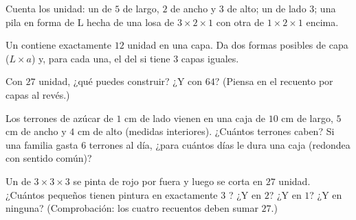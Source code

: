 \begin{exercise}[$\star$]\label{exo:g5:solids:6}
Cuenta los  unidad: un  de $5$ de largo, $2$ de ancho y $3$ de alto; un  de
lado $3$; una pila en forma de L hecha de una losa de $3 \times 2 \times 1$
con otra de $1 \times 2 \times 1$ encima.
\end{exercise}

\begin{exercise}[$\star$]\label{exo:g5:solids:7}
Un  contiene exactamente $12$  unidad en una capa. Da dos formas posibles
de capa ($L \times a$) y, para cada una, el  del  si tiene
$3$ capas iguales.
\end{exercise}

\begin{exercise}[$\star$]\label{exo:g5:solids:8}
Con $27$  unidad, ¿qué  puedes construir? ¿Y con $64$? (Piensa en
el recuento por capas al revés.)
\end{exercise}

\begin{exercise}[$\star\star$]\label{exo:g5:solids:9}
Los terrones de azúcar de $1$ cm de lado vienen en una caja de $10$ cm de largo, $5$ cm de ancho
y $4$ cm de alto (medidas interiores). ¿Cuántos terrones caben? Si una
familia gasta $6$ terrones al día, ¿para cuántos días le dura una caja
(redondea con sentido común)?
\end{exercise}

\begin{exercise}[$\star\star$]\label{exo:g5:solids:10}
Un  de $3 \times 3 \times 3$ se pinta de rojo por fuera y luego se corta
en $27$  unidad. ¿Cuántos  pequeños tienen pintura en exactamente
$3$ ? ¿Y en $2$? ¿Y en $1$? ¿Y en ninguna? (Comprobación: los cuatro recuentos deben sumar
$27$.)
\end{exercise}
